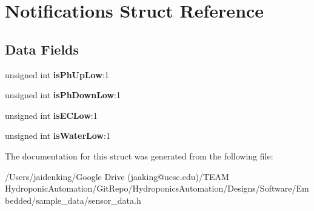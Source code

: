 \hypertarget{struct_notifications}{}\section{Notifications Struct Reference}
\label{struct_notifications}
\subsection*{Data Fields}
\begin{DoxyCompactItemize}
\item 
\mbox{\label{struct_notifications_add65c606a6a357e7f9cf99165fe0fbbd}} 
unsigned int {\bfseries is\+Ph\+Up\+Low}\+:1
\item 
\mbox{\label{struct_notifications_aebc5d1593246bcbab9102d82adcedb38}} 
unsigned int {\bfseries is\+Ph\+Down\+Low}\+:1
\item 
\mbox{\label{struct_notifications_a1aabfa59490b78c7ffb8ad640b86044b}} 
unsigned int {\bfseries is\+E\+C\+Low}\+:1
\item 
\mbox{\label{struct_notifications_a158a58fda9c3004b895cd4aaa8cafb88}} 
unsigned int {\bfseries is\+Water\+Low}\+:1
\end{DoxyCompactItemize}


The documentation for this struct was generated from the following file\+:\begin{DoxyCompactItemize}
\item 
/\+Users/jaidenking/\+Google Drive (jaaking@ucsc.\+edu)/\+T\+E\+A\+M Hydroponic\+Automation/\+Git\+Repo/\+Hydroponics\+Automation/\+Designs/\+Software/\+Embedded/sample\+\_\+data/sensor\+\_\+data.\+h\end{DoxyCompactItemize}
